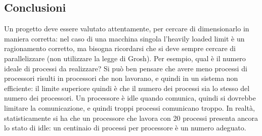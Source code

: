 \subsection{Conclusioni}
Un progetto deve essere valutato attentamente, per cercare di dimensionarlo in maniera corretta: nel caso di una
macchina singola l'heavily loaded limit è un ragionamento corretto, ma bisogna ricordarsi che si deve sempre cercare di
parallelizzare (non utilizzare la legge di Grosh). Per esempio, qual è il numero ideale di processi da realizzare? Si
può ben pensare che avere meno processi di processori risulti in processori che non lavorano, e quindi in un sistema
non efficiente: il limite superiore quindi è che il numero dei processi sia lo stesso del numero dei processori. Un
processore è idle quando comunica, quindi si dovrebbe limitare la comunicazione, e quindi troppi processi comunicano
troppo.
In realtà, statisticamente si ha che un processore che lavora con 20 processi presenta ancora lo stato di idle: un
centinaio di processi per processore è un numero adeguato.
